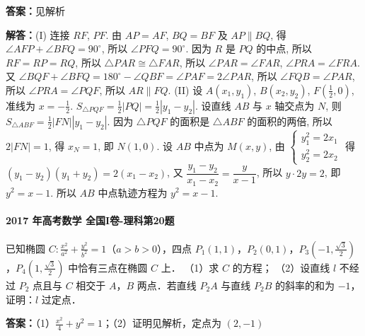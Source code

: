 \documentclass[UTF8,a4paper,11pt]{ctexart}
\begin{document}
\textbf{答案：}见解析\par

\textbf{解答：}(I) 连接 $RF$, $PF$. 由 $AP=AF$, $BQ=BF$ 及 $AP\parallel BQ$, 得 $\angle AFP+\angle BFQ=90^{\circ}$, 所以 $\angle PFQ=90^{\circ}$. 因为 $R$ 是 $PQ$ 的中点, 所以 $RF=RP=RQ$, 所以 $\triangle PAR\cong\triangle FAR$, 所以 $\angle PAR=\angle FAR$, $\angle PRA=\angle FRA$. 又 $\angle BQF+\angle BFQ=180^{\circ}-\angle QBF=\angle PAF=2\angle PAR$, 所以 $\angle FQB=\angle PAR$, 所以 $\angle PRA=\angle PQF$, 所以 $AR\parallel FQ$.
(II) 设 $A(x_1,y_1)$, $B(x_2,y_2)$, $F(\frac{1}{2},0)$, 准线为 $x=-\frac{1}{2}$. $S_{\triangle PQF}=\frac{1}{2}|PQ|=\frac{1}{2}|y_1-y_2|$. 设直线 $AB$ 与 $x$ 轴交点为 $N$, 则 $S_{\triangle ABF}=\frac{1}{2}|FN||y_1-y_2|$. 因为 $\triangle PQF$ 的面积是 $\triangle ABF$ 的面积的两倍, 所以 $2|FN|=1$, 得 $x_N=1$, 即 $N(1,0)$. 设 $AB$ 中点为 $M(x,y)$, 由 $\begin{cases}y_1^2=2x_1\\ y_2^2=2x_2\end{cases}$ 得 $(y_1-y_2)(y_1+y_2)=2(x_1-x_2)$, 又 $\dfrac{y_1-y_2}{x_1-x_2}=\dfrac{y}{x-1}$, 所以 $y\cdot2y=2$, 即 $y^2=x-1$. 所以 $AB$ 中点轨迹方程为 $y^2=x-1$.

\paragraph{2017 年高考数学 全国I卷-理科第20题}

已知椭圆 $C:\frac{x^2}{a^2}+\frac{y^2}{b^2}=1$（$a>b>0$），四点 $P_1(1,1)$，$P_2(0,1)$，$P_3(-1,\frac{\sqrt{3}}{2})$，$P_4(1,\frac{\sqrt{3}}{2})$ 中恰有三点在椭圆 $C$ 上．
（1）求 $C$ 的方程；
（2）设直线 $l$ 不经过 $P_2$ 点且与 $C$ 相交于 $A$，$B$ 两点．若直线 $P_2A$ 与直线 $P_2B$ 的斜率的和为 $-1$，证明：$l$ 过定点．

\textbf{答案：}（1）$\frac{x^2}{4}+y^2=1$；（2）证明见解析，定点为 $(2,-1)$\par
\end{document}
